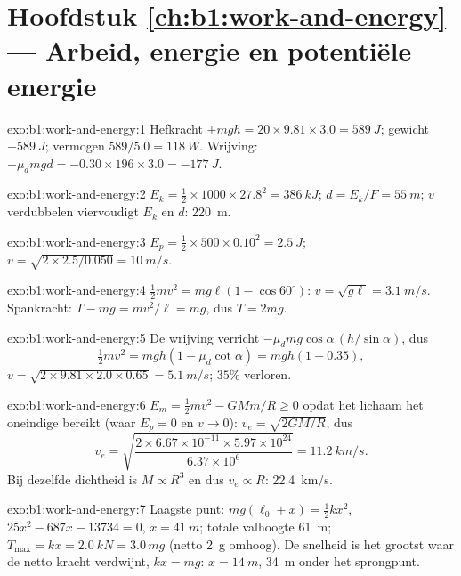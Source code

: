 \section*{Hoofdstuk \ref{ch:b1:work-and-energy} --- Arbeid, energie en potentiële energie}

\begin{solution}{exo:b1:work-and-energy:1}
Hefkracht $+mgh = 20 \times 9.81 \times 3.0 = \qty{589}{J}$; gewicht
$-\qty{589}{J}$; vermogen $589/5.0 = \qty{118}{W}$. Wrijving: $-\mu_dmgd =
-0.30 \times 196 \times 3.0 = \qty{-177}{J}$.
\end{solution}

\begin{solution}{exo:b1:work-and-energy:2}
$E_k = \tfrac12 \times 1000 \times 27.8^2 = \qty{386}{kJ}$; $d = E_k/F =
\qty{55}{m}$; $v$ verdubbelen viervoudigt $E_k$ en $d$: \qty{220}{m}.
\end{solution}

\begin{solution}{exo:b1:work-and-energy:3}
$E_p = \tfrac12 \times 500 \times 0.10^2 = \qty{2.5}{J}$; $v = \sqrt{2 \times
2.5/0.050} = \qty{10}{m/s}$.
\end{solution}

\begin{solution}{exo:b1:work-and-energy:4}
$\tfrac12 mv^2 = mg\ell(1 - \cos 60^\circ)$: $v = \sqrt{g\ell} = \qty{3.1}{m/s}$.
Spankracht: $T - mg = mv^2/\ell = mg$, dus $T = 2mg$.
\end{solution}

\begin{solution}{exo:b1:work-and-energy:5}
De wrijving verricht $-\mu_dmg\cos\alpha\,(h/\sin\alpha)$, dus
\[
\tfrac12 mv^2 = mgh(1 - \mu_d\cot\alpha) = mgh(1 - 0.35),
\]
$v = \sqrt{2 \times 9.81 \times 2.0 \times 0.65} = \qty{5.1}{m/s}$; $35\%$ verloren.
\end{solution}

\begin{solution}{exo:b1:work-and-energy:6}
$E_m = \tfrac12 mv^2 - GMm/R \geq 0$ opdat het lichaam het oneindige bereikt
(waar $E_p = 0$ en $v \to 0$): $v_e = \sqrt{2GM/R}$, dus
\[
v_e = \sqrt{\frac{2 \times 6.67\times10^{-11} \times 5.97\times10^{24}}{6.37\times10^6}}
= \qty{11.2}{km/s}.
\]
Bij dezelfde dichtheid is $M \propto R^3$ en dus $v_e \propto R$: \qty{22.4}{km/s}.
\end{solution}

\begin{solution}{exo:b1:work-and-energy:7}
Laagste punt: $mg(\ell_0 + x) = \tfrac12 kx^2$, $25x^2 - 687x - 13734 = 0$,
$x = \qty{41}{m}$; totale valhoogte \qty{61}{m}; $T_{\max} = kx = \qty{2.0}{kN}
= 3.0\,mg$ (netto \qty{2}{g} omhoog). De snelheid is het grootst waar de netto kracht
verdwijnt, $kx = mg$: $x = \qty{14}{m}$, \qty{34}{m} onder het sprongpunt.
\end{solution}

